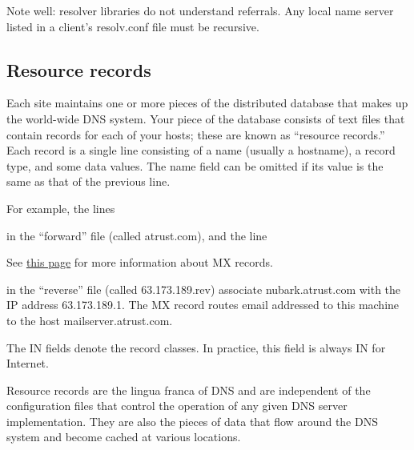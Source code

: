 Note well: resolver libraries {do not} understand referrals. Any local
name server listed in a client's {resolv.conf} file must be recursive.

\protect\hypertarget{part0024_split_014.html}{}{}

\hypertarget{part0024_split_014.htmlux5cux23_idContainer1069}{}
\hypertarget{part0024_split_014.htmlux5cux23calibre_pb_13}{%
\subsection[Resource
records]{\texorpdfstring{\protect\hypertarget{part0024_split_014.htmlux5cux23_idTextAnchor858}{}{}\protect\hypertarget{part0024_split_014.htmlux5cux23_idIndexMarker2033}{}{}Resource
records}{Resource records}}\label{part0024_split_014.htmlux5cux23calibre_pb_13}}

Each site maintains one or more pieces of the distributed database that
makes up the world-wide DNS system. Your piece of the database consists
of text files that contain records for each of your hosts; these are
known as ``resource records.'' Each record is a single line consisting
of a name (usually a hostname), a record type, and some data values. The
name field can be omitted if its value is the same as that of the
previous line.

For example, the lines


in the ``forward'' file (called {atrust.com}), and the line


\leavevmode\hypertarget{part0024_split_014.htmlux5cux23_idContainer917}{}%
See
\protect\hyperlink{part0024_split_027.htmlux5cux23_idTextAnchor882}{this
page} for more information about MX records.

in the
``\protect\hypertarget{part0024_split_014.htmlux5cux23_idIndexMarker2034}{}{}reverse''
file (called {63.173.189.rev}) associate nubark.atrust.com with the IP
address 63.173.189.1. The MX record routes email addressed to this
machine to the host mailserver.atrust.com.

The IN fields denote the record classes. In practice, this field is
always IN for Internet.

Resource records are the lingua franca of DNS and are independent of the
configuration files that control the operation of any given DNS server
implementation. They are also the pieces of data that flow around the
DNS system and become cached at various locations.

